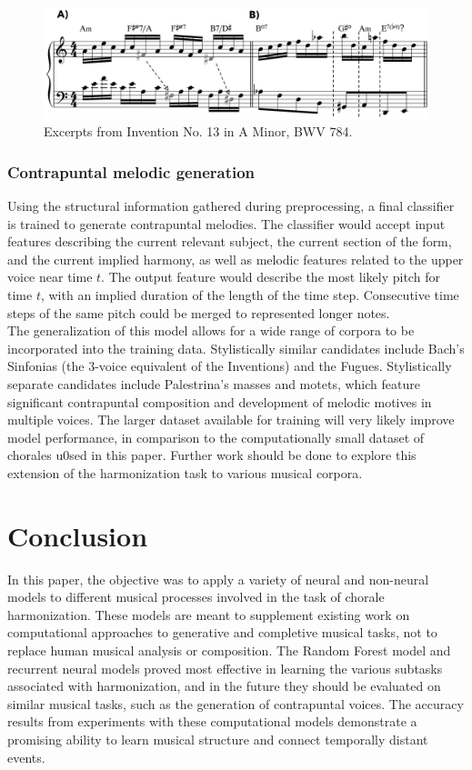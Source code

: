 \documentclass[11pt]{book}
\begin{document}
\begin{figure}[h]
\caption{ Excerpts from Invention No. 13 in A Minor, BWV 784.  }
\centerline{\includegraphics[scale=0.27]{examples/ex2}}
\end{figure}

\subsubsection{Contrapuntal melodic generation}
Using the structural information gathered during preprocessing, a final classifier is trained to generate contrapuntal melodies. The classifier would accept input features describing the current relevant subject, the current section of the form, and the current implied harmony, as well as melodic features related to the upper voice near time $t$. The output feature would describe the most likely pitch for time $t$, with an implied duration of the length of the time step. Consecutive time steps of the same pitch could be merged to represented longer notes. \\
The generalization of this model allows for a wide range of corpora to be incorporated into the training data. Stylistically similar candidates include Bach's Sinfonias (the 3-voice equivalent of the Inventions) and the Fugues. Stylistically separate candidates include Palestrina's masses and motets, which feature significant contrapuntal composition and development of melodic motives in multiple voices. The larger dataset available for training will very likely improve model performance, in comparison to the computationally small dataset of chorales u0sed in this paper. Further work should be done to explore this extension of the harmonization task to various musical corpora.

\section{Conclusion}

In this paper, the objective was to apply a variety of neural and non-neural models to different musical processes involved in the task of chorale harmonization. These models are meant to supplement existing work on computational approaches to generative and completive musical tasks, not to replace human musical analysis or composition. The Random Forest model and recurrent neural models proved most effective in learning the various subtasks associated with harmonization, and in the future they should be evaluated on similar musical tasks, such as the generation of contrapuntal voices. The accuracy results from experiments with these computational models demonstrate a promising ability to learn musical structure and connect temporally distant events.
\end{document}
